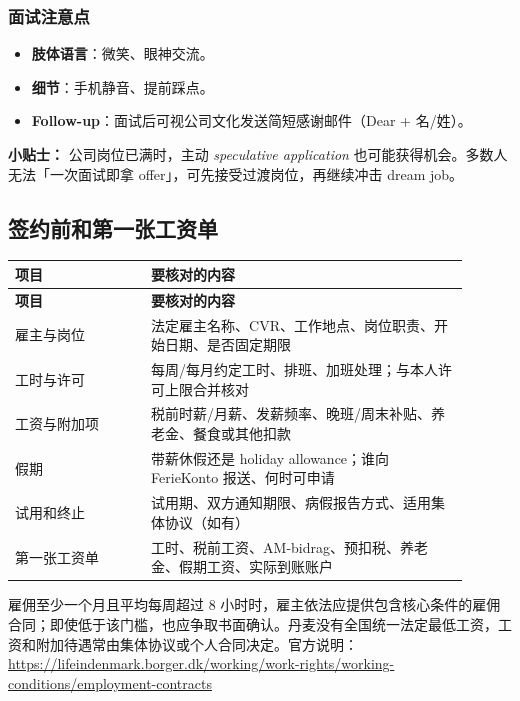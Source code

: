 \subsubsection{面试注意点}
\begin{itemize}[leftmargin=1.5em]
  \item \textbf{肢体语言}：微笑、眼神交流。
  \item \textbf{细节}：手机静音、提前踩点。
  \item \textbf{Follow-up}：面试后可视公司文化发送简短感谢邮件（Dear + 名/姓）。
\end{itemize}

\begin{grayleftbox}\textbf{小贴士：}
公司岗位已满时，主动 \textit{speculative application} 也可能获得机会。多数人无法「一次面试即拿 offer」，可先接受过渡岗位，再继续冲击 dream job。
\end{grayleftbox}

\subsection{签约前和第一张工资单}

\small
{}
\begin{longtable}{p{0.27\linewidth}p{0.63\linewidth}}
  \toprule
  \textbf{项目} & \textbf{要核对的内容} \\
  \midrule
  \endfirsthead
  \toprule
  \textbf{项目} & \textbf{要核对的内容} \\
  \midrule
  \endhead
  \bottomrule
  \endfoot
  雇主与岗位 & 法定雇主名称、CVR、工作地点、岗位职责、开始日期、是否固定期限 \\
  工时与许可 & 每周/每月约定工时、排班、加班处理；与本人许可上限合并核对 \\
  工资与附加项 & 税前时薪/月薪、发薪频率、晚班/周末补贴、养老金、餐食或其他扣款 \\
  假期 & 带薪休假还是 holiday allowance；谁向 FerieKonto 报送、何时可申请 \\
  试用和终止 & 试用期、双方通知期限、病假报告方式、适用集体协议（如有） \\
  第一张工资单 & 工时、税前工资、AM-bidrag、预扣税、养老金、假期工资、实际到账账户 \\
\end{longtable}
\normalsize

雇佣至少一个月且平均每周超过 8 小时时，雇主依法应提供包含核心条件的雇佣合同；即使低于该门槛，也应争取书面确认。丹麦没有全国统一法定最低工资，工资和附加待遇常由集体协议或个人合同决定。官方说明：\url{https://lifeindenmark.borger.dk/working/work-rights/working-conditions/employment-contracts}

